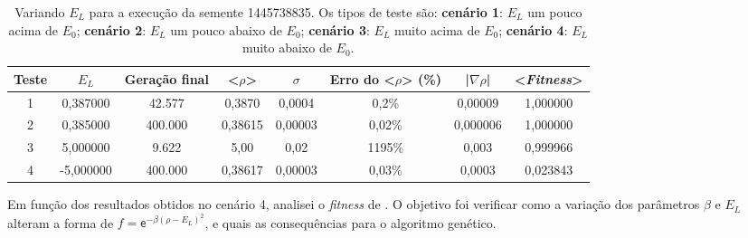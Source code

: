 \begin{center}	
\begin{table}[htbp]
\caption{Variando $E_L$ para a execução da semente 1445738835. Os tipos de teste são: \textbf{cenário 1}: $E_L$ um pouco acima de $E_0$; \textbf{cenário 2}: $E_L$ um pouco abaixo de $E_0$; \textbf{cenário 3}: $E_L$ muito acima de $E_0$; \textbf{cenário 4}: $E_L$ muito abaixo de $E_0$.}
\label{tab:VariandoELPraPrimeiraExecucao}
\centering
\begin{tabular}{cccccccc}
\hline \hline
\textbf{Teste} &  \textbf{$E_L$} & \textbf{Geração final} & \textbf{<$\rho$>} & \textbf{$\sigma$} & \textbf{Erro do <$\rho$> (\%)} & \textbf{|$\nabla \rho$|} & \textbf{<\emph{Fitness}>} \\
\hline \hline
         1 &   0,387000 &     42.577 &     0,3870 &     0,0004 &      0,2\% &    0,00009 &   1,000000 \\
\hline
         2 &   0,385000 &    400.000 &    0,38615 &    0,00003 &     0,02\% &   0,000006 &   1,000000 \\
\hline
         3 &   5,000000 &      9.622 &       5,00 &       0,02 &     1195\% &      0,003 &   0,999966 \\
\hline
         4 &  -5,000000 &    400.000 &    0,38617 &    0,00003 &     0,03\% &     0,0003 &   0,023843 \\
\hline \hline
\end{tabular}   
\end{table}
\end{center}	
	
Em função dos resultados obtidos no cenário 4, analisei o \emph{fitness} de \cite{metodo2011}. O objetivo foi verificar como a variação dos parâmetros $\beta$ e $E_L$ alteram a forma de $f = \mathsf{e}^{-\beta(\rho - E_L)^2}$, e quais as consequências para o algoritmo genético. 
	
